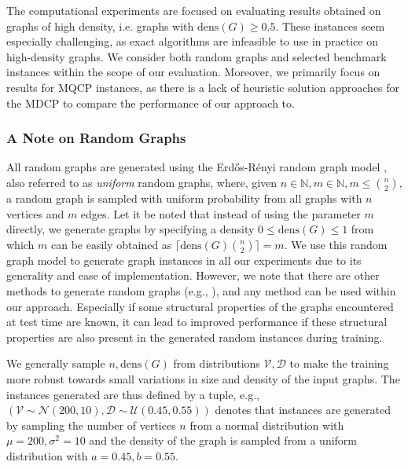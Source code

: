 \documentclass[draft,final]{vutinfth} %
\begin{document}
The computational experiments are focused on evaluating results obtained on graphs of high density, i.e. graphs with $\mathrm{dens}(G) \geq 0.5$. 
These instances seem especially challenging, as exact algorithms are infeasible to use in practice on high-density graphs. We consider both random graphs and selected benchmark instances within the scope of our evaluation. Moreover, we primarily focus on results for MQCP instances, as there is a lack of heuristic solution approaches for the MDCP to compare the performance of our approach to. 


\subsubsection{A Note on Random Graphs}
All random graphs are generated using the Erd\H{o}s-Rényi random graph model \cite{erdos59a}, also referred to as \emph{uniform} random graphs, where, given $n \in \mathbb{N}, m \in \mathbb{N}, m \leq \binom{n}{2}$, a random graph is sampled with uniform probability from all graphs with $n$ vertices and $m$ edges. Let it be noted that instead of using the parameter $m$ directly, we generate graphs by specifying a density $0 \leq \mathrm{dens}(G) \leq 1$ from which $m$ can be easily obtained as $\lceil \mathrm{dens}(G) \binom{n}{2} \rceil = m$. 
We use this random graph model to generate graph instances in all our experiments due to its generality and ease of implementation. 
However, we note that there are other methods to generate random graphs (e.g., \cite{Aiello2001}), and any method can be used within our approach. Especially if some structural properties of the graphs encountered at test time are known, it can lead to improved performance if these structural properties are also present in the generated random instances during training. 

We generally sample $n, \mathrm{dens}(G)$ from distributions $\mathcal{V}, \mathcal{D}$ to make the training more robust towards small variations in size and density of the input graphs. The instances generated are thus defined by a tuple, e.g., $(\mathcal{V} \sim \mathcal{N}(200, 10), \mathcal{D} \sim \mathcal{U}(0.45, 0.55))$ denotes that instances are generated by sampling the number of vertices $n$ from a normal distribution with $\mu=200, \sigma^2 = 10$ and the density of the graph is sampled from a uniform distribution with $a=0.45, b=0.55$. 
\end{document}

